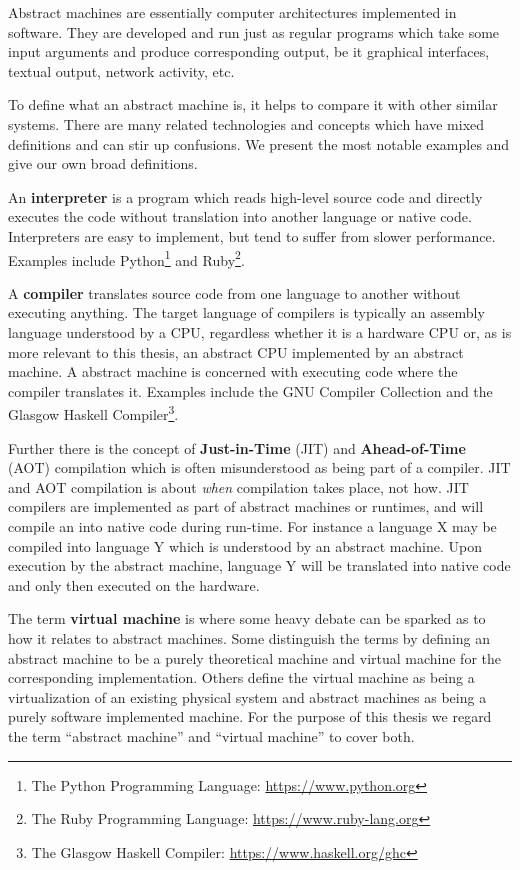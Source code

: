 Abstract machines are essentially computer architectures implemented in
software. They are developed and run just as regular programs which take some
input arguments and produce corresponding output, be it graphical interfaces,
textual output, network activity, etc.

To define what an abstract machine is, it helps to compare it with other similar
systems. There are many related technologies and concepts which have mixed
definitions and can stir up confusions. We present the most notable examples and
give our own broad definitions.

An \textbf{interpreter} is a program which reads high-level source code and
directly executes the code without translation into another language or native
code. Interpreters are easy to implement, but tend to suffer from slower
performance\cite{circuitstoday}. Examples include Python\footnote{The Python
  Programming Language: \url{https://www.python.org}} and Ruby\footnote{The Ruby
  Programming Language: \url{https://www.ruby-lang.org}}.

A \textbf{compiler} translates source code from one language to another without
executing anything. The target language of compilers is typically an assembly
language understood by a CPU, regardless whether it is a hardware CPU or, as is
more relevant to this thesis, an abstract CPU implemented by an abstract
machine. A abstract machine is concerned with executing code where the compiler
translates it. Examples include the GNU Compiler Collection\cite{gnu:gcc} and
the Glasgow Haskell Compiler\footnote{The Glasgow Haskell Compiler:
  \url{https://www.haskell.org/ghc}}.


Further there is the concept of \textbf{Just-in-Time} (JIT) and
\textbf{Ahead-of-Time} (AOT) compilation which is often misunderstood as being
part of a compiler. JIT and AOT compilation is about \textit{when} compilation
takes place, not how. JIT compilers are implemented as part of abstract machines
or runtimes, and will compile an  into native
code during run-time. For instance a language X may be compiled into language Y
which is understood by an abstract machine. Upon execution by the abstract
machine, language Y will be translated into native code and only then executed
on the hardware.

The term \textbf{virtual machine} is where some heavy debate can be sparked as
to how it relates to abstract machines. Some distinguish the terms by defining
an abstract machine to be a purely theoretical machine and virtual machine for
the corresponding implementation. Others define the virtual machine as being a
virtualization of an existing physical system and abstract machines as being a
purely software implemented machine. For the purpose of this thesis we regard
the term ``abstract machine'' and ``virtual machine'' to cover both.

